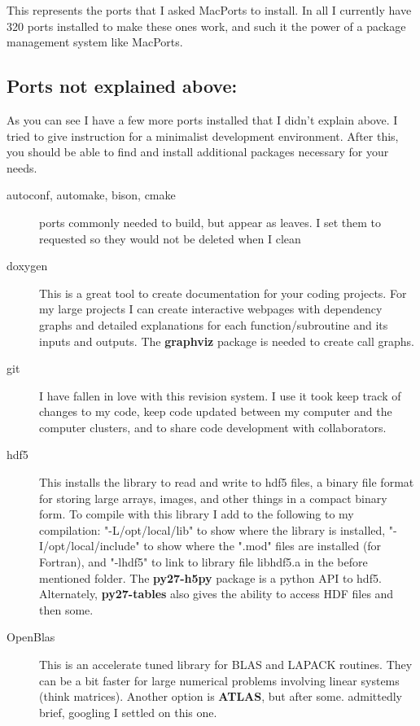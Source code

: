 \documentclass[11pt]{article}
\begin{document}
This represents the ports that I asked MacPorts to install. In all I currently have 320 ports installed to make these ones work, and such it the power of a package management system like MacPorts. 

\subsection*{Ports not explained above:}

As you can see I have a few more ports installed that I didn't explain above. I tried to give instruction for a minimalist development environment. After this, you should be able to find and install additional packages necessary for your needs.

\begin{description}
	\item[autoconf, automake, bison, cmake] ports commonly needed to build, but appear as leaves. I set them to requested so they would not be deleted when I clean
	\item[doxygen] This is a great tool to create documentation for your coding projects. For my large projects I can create interactive webpages with dependency graphs and detailed explanations for each function/subroutine and its inputs and outputs. The {\bf graphviz} package is needed to create call graphs.
	\item[git] I have fallen in love with this revision system. I use it took keep track of changes to my code, keep code updated between my computer and the computer clusters, and to share code development with collaborators.
	\item[hdf5] This installs the library to read and write to hdf5 files, a binary file format for storing large arrays, images, and other things in a compact binary form. To compile with this library I add to the following to my compilation: "-L/opt/local/lib" to show where the library is installed, "-I/opt/local/include" to show where the ".mod" files are installed (for Fortran), and "-lhdf5" to link to library file libhdf5.a in the before mentioned folder. The {\bf py27-h5py} package is a python API to hdf5. Alternately, {\bf py27-tables} also gives the ability to access HDF files and then some.
	\item[OpenBlas] This is an accelerate tuned library for BLAS and LAPACK routines. They can be a bit faster for large numerical problems involving linear systems (think matrices). Another option is {\bf ATLAS}, but after some. admittedly brief, googling I settled on this one. 

\end{description}
\end{document}
